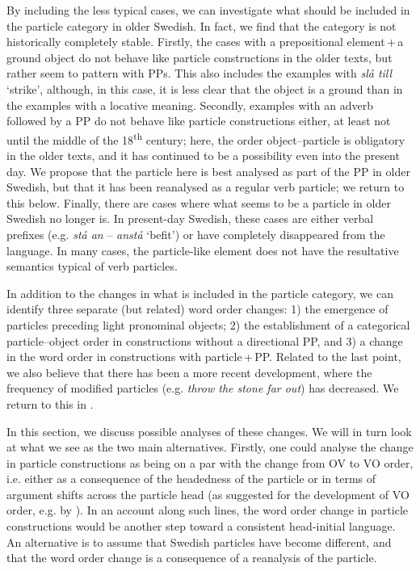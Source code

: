\documentclass[output=paper]{langscibook}
\begin{document}
By including the less typical cases, we can investigate what should be included in the particle category in older Swedish. In fact, we find that the category is not historically completely stable. Firstly, the cases with a prepositional element\,+\,a ground object do not behave like particle constructions in the older texts, but rather seem to pattern with PPs. This also includes the examples with \textit{slå till} ‘strike’, although, in this case, it is less clear that the object is a ground than in the examples with a locative meaning. Secondly, examples with an adverb followed by a PP do not behave like particle constructions either, at least not until the middle of the 18\textsuperscript{th} century; here, the order object–particle is obligatory in the older texts, and it has continued to be a possibility even into the present day. We propose that the particle here is best analysed as part of the PP in older Swedish, but that it has been reanalysed as a regular verb particle; we return to this below. Finally, there are cases where what seems to be a particle in older Swedish no longer is. In present-day Swedish, these cases are either verbal prefixes (e.g. \textit{stå an} – \textit{anstå} ‘befit’) or have completely disappeared from the language. In many cases, the particle-like element does not have the resultative semantics typical of verb particles. 



In addition to the changes in what is included in the particle category, we can identify three separate (but related) word order changes: 1) the emergence of particles preceding light pronominal objects; 2) the establishment of a categorical particle–object order in constructions without a directional PP, and 3) a change in the word order in constructions with particle\,+\,PP. Related to the last point, we also believe that there has been a more recent development, where the frequency of modified particles (e.g. \textit{throw the stone far out}) has decreased. We return to this in .



In this section, we discuss possible analyses of these changes. We will in turn look at what we see as the two main alternatives. Firstly, one could analyse the change in particle constructions as being on a par with the change from OV to VO order, i.e. either as a consequence of the headedness of the particle or in terms of argument shifts across the particle head (as suggested for the development of VO order, e.g. by \citealt{Petzell2011}). In an account along such lines, the word order change in particle constructions would be another step toward a consistent head-initial language. An alternative is to assume that Swedish particles have become different, and that the word order change is a consequence of a reanalysis of the particle. 
\end{document}
